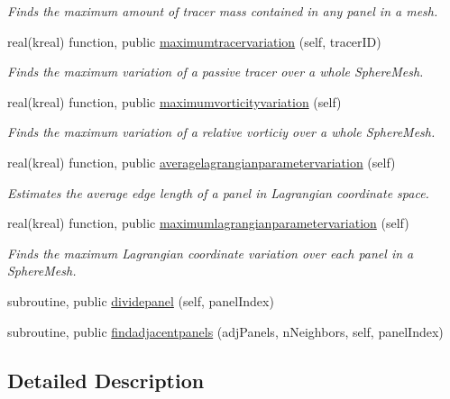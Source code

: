 \begin{DoxyCompactItemize}
\begin{DoxyCompactList}\small\item\em Finds the maximum amount of tracer mass contained in any panel in a mesh. \end{DoxyCompactList}\item 
real(kreal) function, public \hyperlink{group__SphereMesh_ga6f36560d3412a7d7e4cfa5befdb7533a}{maximumtracervariation} (self, tracer\+I\+D)
\begin{DoxyCompactList}\small\item\em Finds the maximum variation of a passive tracer over a whole Sphere\+Mesh. \end{DoxyCompactList}\item 
real(kreal) function, public \hyperlink{group__SphereMesh_gaae2d1cf4ffc3bae54040cbeea7b7d0be}{maximumvorticityvariation} (self)
\begin{DoxyCompactList}\small\item\em Finds the maximum variation of a relative vorticiy over a whole Sphere\+Mesh. \end{DoxyCompactList}\item 
real(kreal) function, public \hyperlink{group__SphereMesh_gaa98d1a869045c29e59c388b3defd5267}{averagelagrangianparametervariation} (self)
\begin{DoxyCompactList}\small\item\em Estimates the average edge length of a panel in Lagrangian coordinate space. \end{DoxyCompactList}\item 
real(kreal) function, public \hyperlink{group__SphereMesh_ga27be9c6a5c086d37db3dd65c2c8ec37b}{maximumlagrangianparametervariation} (self)
\begin{DoxyCompactList}\small\item\em Finds the maximum Lagrangian coordinate variation over each panel in a Sphere\+Mesh. \end{DoxyCompactList}\item 
subroutine, public \hyperlink{classspheremeshmodule_a8178d3931d36fed89706bdbcb071b69b}{dividepanel} (self, panel\+Index)
\item 
subroutine, public \hyperlink{classspheremeshmodule_a40ef1c43bfb85ce697ddf617209a3886}{findadjacentpanels} (adj\+Panels, n\+Neighbors, self, panel\+Index)
\end{DoxyCompactItemize}


\subsection{Detailed Description}


